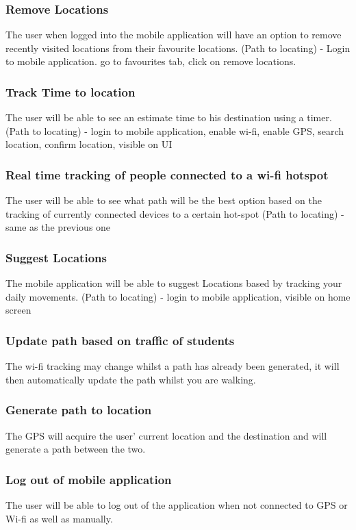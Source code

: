 \documentclass{article}
\begin{document}
\subsubsection{Remove Locations}
The user when logged into the mobile application will have an option to remove recently visited locations from their favourite locations. (Path to locating) - Login to mobile application. go to favourites tab, click on remove locations.

\subsubsection{Track Time to location}
The user will be able to see an estimate time to his destination using a timer. (Path to locating) - login to mobile application, enable wi-fi, enable GPS, search location, confirm location, visible on UI 
\subsubsection{Real time tracking of people connected to a wi-fi hotspot}
The user will be able to see what path will be the best option based on the tracking of currently connected devices to a certain hot-spot (Path to locating) - same as the previous one
\subsubsection{Suggest Locations}
The mobile application will be able to suggest Locations based by tracking your daily movements. (Path to locating) - login to mobile application, visible on home screen
\subsubsection{Update path based on traffic of students}
The wi-fi tracking may change whilst a path has already been generated, it will then automatically update the path whilst you are walking.
\subsubsection{Generate path to location}
The GPS will acquire the user' current location and the destination and will generate a path between the two.
\subsubsection{Log out of mobile application}
The user will be able to log out of the application when not connected to GPS or Wi-fi as well as manually.
\end{document}

